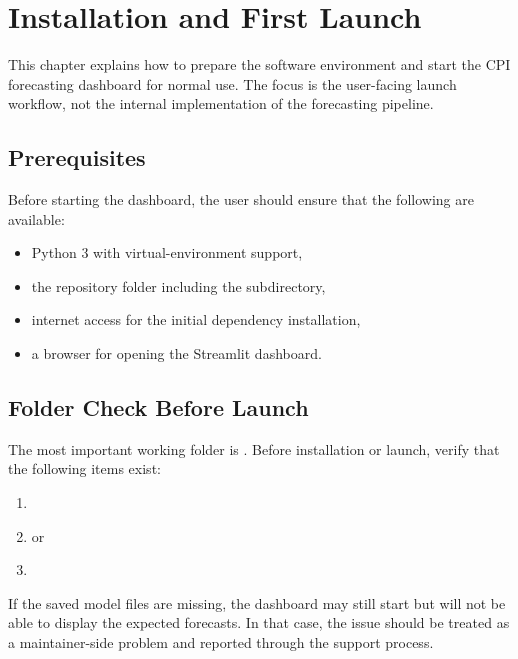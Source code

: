 %
%

\chapter{Installation and First Launch}
\label{ch:installation-first-launch}

This chapter explains how to prepare the software environment and start the CPI forecasting dashboard for normal use. The focus is the user-facing launch workflow, not the internal implementation of the forecasting pipeline.

\section{Prerequisites}

Before starting the dashboard, the user should ensure that the following are available:

\begin{itemize}
    \item Python 3 with virtual-environment support,
    \item the repository folder including the  subdirectory,
    \item internet access for the initial dependency installation,
    \item a browser for opening the Streamlit dashboard.
\end{itemize}

\section{Folder Check Before Launch}

The most important working folder is . Before installation or launch, verify that the following items exist:

\begin{enumerate}
    \item {}
    \item {} or 
    \item {}
\end{enumerate}

If the saved model files are missing, the dashboard may still start but will not be able to display the expected forecasts. In that case, the issue should be treated as a maintainer-side problem and reported through the support process.

